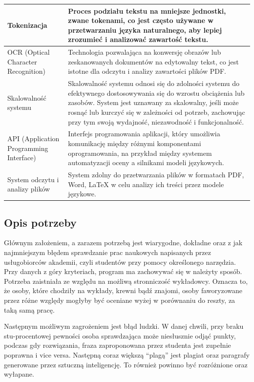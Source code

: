 \documentclass[a4paper, 12pt]{article}
\begin{document}
\begin{longtable}{|p{}|p{}|}
\hline
Tokenizacja & Proces podziału tekstu na mniejsze jednostki, zwane tokenami, co jest często używane w przetwarzaniu języka naturalnego, aby lepiej zrozumieć i analizować zawartość tekstu. \\
\hline
OCR (Optical Character Recognition) & Technologia pozwalająca na konwersję obrazów lub zeskanowanych dokumentów na edytowalny tekst, co jest istotne dla odczytu i analizy zawartości plików PDF. \\
\hline
Skalowalność systemu & Skalowalność systemu odnosi się do zdolności systemu do efektywnego dostosowywania się do wzrostu obciążenia lub zasobów. System jest uznawany za skalowalny, jeśli może rosnąć lub kurczyć się w zależności od potrzeb, zachowując przy tym swoją wydajność, niezawodność i funkcjonalność. \\
\hline
API (Application Programming Interface) & Interfejs programowania aplikacji, który umożliwia komunikację między różnymi komponentami oprogramowania, na przykład między systemem automatyzacji oceny a silnikami modeli językowych. \\
\hline
System odczytu i analizy plików & System zdolny do przetwarzania plików w formatach PDF, Word, LaTeX w celu analizy ich treści przez modele językowe. \\
\hline
\end{longtable}

\subsection{Opis potrzeby}
Głównym założeniem, a zarazem potrzebą jest wiarygodne, dokładne oraz z jak najmniejszym błędem sprawdzanie prac naukowych napisanych przez usługobiorców akademii, czyli studentów przy pomocy określonego narzędzia.
Przy danych z góry kryteriach, program ma zachowywać się w należyty sposób.
Potrzeba zaistniała ze względu na możliwą stronniczość wykładowcy.
Oznacza to, że osoby, które chodziły na wykłady, krewni bądź znajomi, osoby faworyzowane przez różne względy mogłyby być oceniane wyżej w porównaniu do reszty, za taką samą pracę.

Następnym możliwym zagrożeniem jest błąd ludzki. W danej chwili, przy braku stu-procentowej pewności osoba sprawdzająca może niesłusznie odjąć punkty, podczas gdy rozwiązania, fraza zaproponowana przez studenta jest zupełnie poprawna i vice versa.
Następną coraz większą “plagą” jest plagiat oraz paragrafy generowane przez sztuczną inteligencję.
To również powinno być rozróżnione oraz wyłapane.
\end{document}
